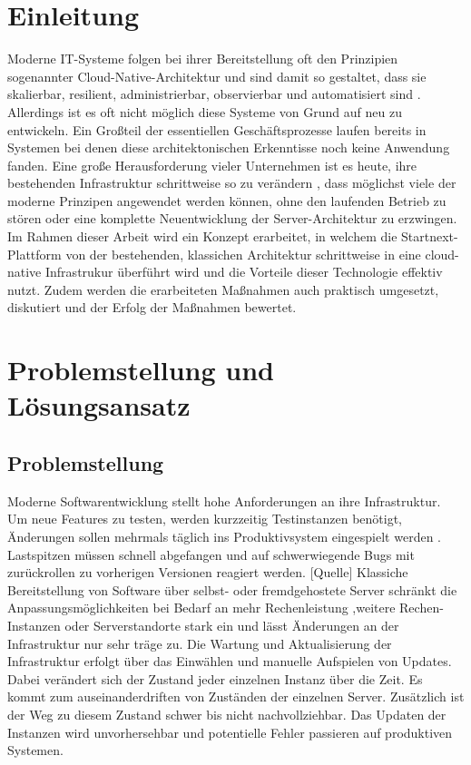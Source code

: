 \documentclass[11pt]{scrartcl}
\begin{document}
\section{Einleitung}

Moderne IT-Systeme folgen bei ihrer Bereitstellung oft den Prinzipien sogenannter Cloud-Native-Architektur
und sind damit so gestaltet, dass sie skalierbar, resilient, administrierbar, observierbar und automatisiert sind \cite{Lee:2021}. 
Allerdings ist es oft nicht möglich diese Systeme von Grund auf neu zu entwickeln. Ein Großteil der essentiellen Geschäftsprozesse 
laufen bereits in Systemen bei denen diese architektonischen Erkenntisse noch keine Anwendung fanden. Eine große Herausforderung vieler 
Unternehmen ist es heute, ihre bestehenden Infrastruktur schrittweise so zu verändern \cite{Fiedelholtz:2021}, dass möglichst viele der 
moderne Prinzipen angewendet werden können, ohne den laufenden Betrieb zu stören oder eine komplette Neuentwicklung der Server-Architektur 
zu erzwingen. Im Rahmen dieser Arbeit wird ein Konzept erarbeitet, in welchem die Startnext-Plattform von der bestehenden, klassichen Architektur 
schrittweise in eine cloud-native Infrastrukur überführt wird und die Vorteile dieser Technologie effektiv nutzt. Zudem werden die erarbeiteten 
Maßnahmen auch praktisch umgesetzt, diskutiert und der Erfolg der Maßnahmen bewertet.

\section{\label{sec:problem_loesung}Problemstellung und Lösungsansatz}
\subsection{Problemstellung}
Moderne Softwarentwicklung stellt hohe Anforderungen an ihre Infrastruktur. Um neue Features zu testen, werden kurzzeitig Testinstanzen benötigt, Änderungen sollen mehrmals täglich ins Produktivsystem eingespielt werden \cite{IBM:2019}. Lastspitzen müssen schnell abgefangen und auf schwerwiegende Bugs mit zurückrollen zu vorherigen Versionen reagiert werden. [Quelle] Klassiche Bereitstellung von Software über selbst- oder fremdgehostete Server schränkt die Anpassungsmöglichkeiten bei Bedarf an mehr Rechenleistung ,weitere Rechen-Instanzen oder Serverstandorte stark ein und lässt Änderungen an der Infrastruktur nur sehr träge zu. \newline Die Wartung und Aktualisierung der Infrastruktur erfolgt über das Einwählen und manuelle Aufspielen von Updates. Dabei verändert sich der Zustand jeder einzelnen Instanz über die Zeit. Es kommt zum auseinanderdriften von Zuständen der einzelnen Server. Zusätzlich ist der Weg zu diesem Zustand schwer bis nicht nachvollziehbar. Das Updaten der Instanzen wird unvorhersehbar und potentielle Fehler passieren auf produktiven Systemen. 
\end{document}
